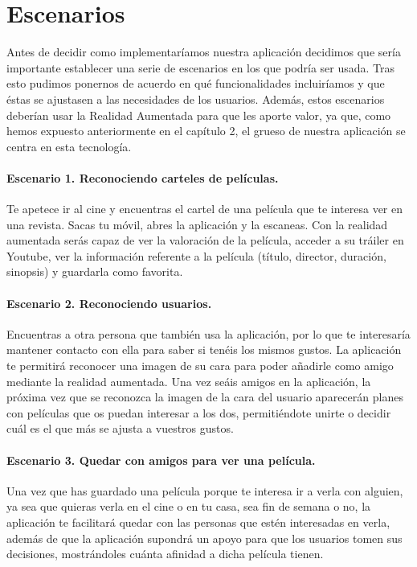 \section{Escenarios}
\label{makereference3.2}
Antes de decidir como implementaríamos nuestra aplicación decidimos que sería importante establecer una serie
de escenarios en los que podría ser usada. Tras esto pudimos ponernos de acuerdo en qué funcionalidades incluiríamos y que 
éstas se ajustasen a las necesidades de los usuarios. Además, estos escenarios deberían usar la Realidad Aumentada para que 
les aporte valor, ya que, como hemos expuesto anteriormente en el capítulo 2, el grueso de nuestra aplicación se centra en esta tecnología.

\paragraph{Escenario 1. Reconociendo carteles de películas.}
\begin{flushleft}
    Te apetece ir al cine y encuentras el cartel de una película que te interesa ver en una revista. Sacas tu móvil, abres la aplicación y 
    la escaneas. Con la realidad aumentada serás capaz de ver la valoración de la película, acceder a su tráiler en Youtube, ver la información
    referente a la película (título, director, duración, sinopsis) y guardarla como favorita.
    
\end{flushleft}
\paragraph{Escenario 2. Reconociendo usuarios.}
\begin{flushleft}
    Encuentras a otra persona que también usa la aplicación, por lo que te interesaría mantener contacto con ella para saber si tenéis los mismos 
    gustos. La aplicación te permitirá reconocer una imagen de su cara para poder añadirle como amigo mediante la realidad aumentada. Una vez seáis amigos en la aplicación,
    la próxima vez que se reconozca la imagen de la cara del usuario aparecerán planes con películas que os puedan interesar a los dos, permitiéndote unirte o decidir cuál es el
    que más se ajusta a vuestros gustos.
\end{flushleft}

\paragraph{Escenario 3. Quedar con amigos para ver una película.}
\begin{flushleft}
    Una vez que has guardado una película porque te interesa ir a verla con alguien, ya sea que quieras verla en el cine o en tu casa, sea fin de semana o no, la aplicación te facilitará quedar 
    con las personas que estén interesadas en verla, además de que la aplicación supondrá un apoyo para que los usuarios tomen sus decisiones, mostrándoles cuánta afinidad a dicha película tienen.
\end{flushleft}

